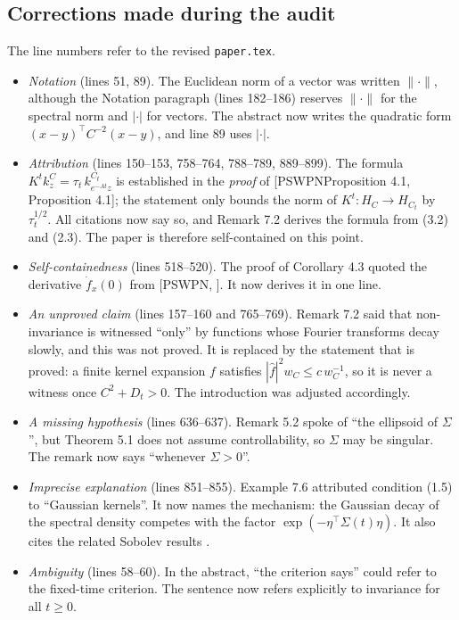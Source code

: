\documentclass[11pt]{amsart}
\newcommand{\hatf}[1]{\widehat{#1}}
\newcommand{\tp}{\top}
\newcommand{\file}[1]{\texttt{#1}}
\newcommand{\PS}[1][]{[PSWPN\ifx\relax#1\relax\else, #1\fi]}
\begin{document}
\subsection{Corrections made during the audit}\label{sec:corrections}
The line numbers refer to the revised \file{paper.tex}.
\begin{itemize}
\item[C1] \emph{Notation} (lines 51, 89). The Euclidean norm of a vector was written $\|\cdot\|$, although the
Notation paragraph (lines 182--186) reserves $\|\cdot\|$ for the spectral norm and $|\cdot|$ for vectors. The abstract
now writes the quadratic form $(x-y)^\tp C^{-2}(x-y)$, and line 89 uses $|\cdot|$.
\item[C2] \emph{Attribution} (lines 150--153, 758--764, 788--789, 889--899). The formula
$K^tk^C_z=\tau_t\,k^{C_t}_{e^{-At}z}$ is established in the \emph{proof} of \PS[Proposition 4.1]; the statement only
bounds the norm of $K^t\colon H_C\to H_{C_t}$ by $\tau_t^{1/2}$. All citations now say so, and Remark 7.2 derives the
formula from (3.2) and (2.3). The paper is therefore self-contained on this point.
\item[C3] \emph{Self-containedness} (lines 518--520). The proof of Corollary 4.3 quoted the derivative $\dot f_x(0)$
from \PS. It now derives it in one line.
\item[C4] \emph{An unproved claim} (lines 157--160 and 765--769). Remark 7.2 said that non-invariance is witnessed
``only'' by functions whose Fourier transforms decay slowly, and this was not proved. It is replaced by the statement
that is proved: a finite kernel expansion $f$ satisfies $|\hatf f|^2w_C\le c\,w_C^{-1}$, so it is never a witness
once $C^2+D_t>0$. The introduction was adjusted accordingly.
\item[C5] \emph{A missing hypothesis} (lines 636--637). Remark 5.2 spoke of ``the ellipsoid of $\Sigma$'', but
Theorem 5.1 does not assume controllability, so $\Sigma$ may be singular. The remark now says ``whenever $\Sigma>0$''.
\item[C6] \emph{Imprecise explanation} (lines 851--855). Example 7.6 attributed condition (1.5) to ``Gaussian
kernels''. It now names the mechanism: the Gaussian decay of the spectral density competes with the factor
$\exp(-\eta^\tp\Sigma(t)\eta)$. It also cites the related Sobolev results \cite{Koehne,Hertel}.
\item[C7] \emph{Ambiguity} (lines 58--60). In the abstract, ``the criterion says'' could refer to the fixed-time
criterion. The sentence now refers explicitly to invariance for all $t\ge0$.

\end{itemize}
\end{document}
